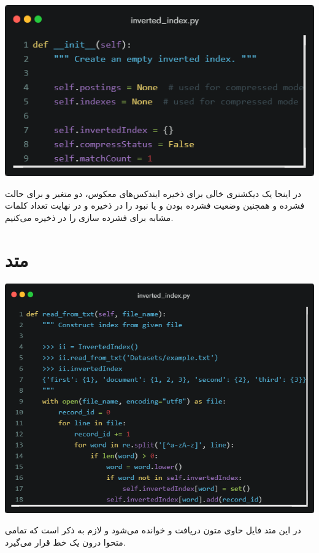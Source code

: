 \documentclass[12pt, dvipsnames, svgnames, x11names,]{article}
\begin{document}
		{\includegraphics[width=14cm]{images/2.png}} \par
		\vspace{0.5cm}
		{\normalsize
			 در اینجا یک دیکشنری خالی برای ذخیره ایندکس‌های معکوس، دو متغیر و  برای حالت فشرده و همچنین وضعیت فشرده بودن و یا نبود را در  ذخیره و در نهایت تعداد کلمات مشابه برای فشرده سازی را در  ذخیره می‌کنیم.
			 }
	
	
	\section{متد }
	
		{\includegraphics[width=14cm]{images/3.png}} \par
		\vspace{0.5cm}
		{\normalsize
			در این متد فایل حاوی متون دریافت و خوانده می‌شود و لازم به ذکر است که تمامی متحوا درون یک خط قرار می‌گیرد.
		} \par
\end{document}
